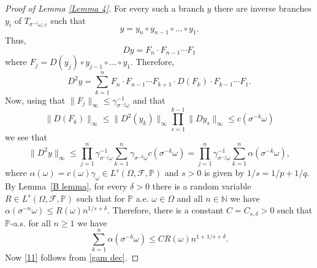 \documentclass[11pt,reqno,a4paper]{article}
\theoremstyle{special}
\def\N{\mathbb{N}}
\def\om{\omega}
\begin{document}
\begin{proof}[Proof of Lemma \ref{Lemma 4}]
  For every such a  branch $y$ there are inverse  branches $y_i$ of $T_{\sigma^{-i}\omega,\varepsilon}$  such that 
  $$
y=y_n\circ y_{n-1}\circ\ldots\circ y_1.
  $$
  Thus, 
  $$
Dy=F_n\cdot F_{n-1}\cdots F_1 
  $$
  where
   $F_j=D(y_j)\circ y_{j-1}\circ\ldots \circ y_1$. Therefore, 
\begin{equation}\label{D2F}
  D^2y=\sum_{k=1}^n F_{n}\cdot F_{n-1}\cdots F_{k+1}\cdot D(F_k)\cdot F_{k-1}\cdots F_1.
\end{equation}
  Now, using that $\|F_j\|_\infty\leq \gamma_{\sigma^{-j}\omega}^{-1}$ and that 
  $$
\|D(F_k)\|_\infty\leq\|D^2(y_k)\|_\infty\prod_{s=1}^{k-1}\|Dy_s\|_\infty\leq
c(\sigma^{-k}\omega)
  $$
  we see that 
  $$
\|D^2y\|_\infty\leq\prod_{j=1}^n\gamma_{\sigma^{-j}\omega}^{-1}\sum_{k=1}^n \gamma_{\sigma^{-k}\omega}c(\sigma^{-k}\omega)=\prod_{j=1}^n\gamma_{\sigma^{-j}\omega}^{-1}\sum_{k=1}^n\alpha(\sigma^{-k}\omega),
  $$
where $\alpha(\omega)=c(\omega)\gamma_\omega\in L^s(\Omega,\mathcal F,\mathbb P)$ and $s>0$ 
is given by $1/s=1/p+1/q$. By Lemma~\ref{B lemma}, for every $\delta>0$ 
there is a random variable $R\in L^s(\Omega,\mathcal F,\mathbb P)$ such that for $\mathbb P$ a.e. $\om \in \Omega$ and all $n\in \N$ we have $\alpha(\sigma^{-n}\omega)\leq R(\omega)n^{1/s+\delta}$. Therefore, there is a constant $C=C_{s,\delta}>0$ such that $\mathbb P$-a.s. for all $n\geq1$ we have
  \begin{equation}\label{above}
\sum_{k=1}^n\alpha(\sigma^{-k}\omega)\leq CR(\omega)n^{1+1/s+\delta}.      
  \end{equation}
Now \eqref{11} follows from \eqref{gam dec}.




\end{proof}
\end{document}
